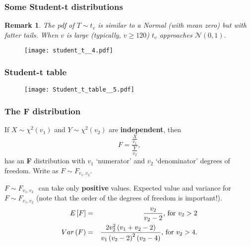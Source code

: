 \documentclass[notes=show,smaller,handout]{beamer}\usepackage[]{graphicx}\usepackage[]{color}
\newtheorem{remark}{Remark}[section]
\newcommand{\N}{\mathcal{N}}
\begin{document}
\begin{frame}%

\frametitle{Some Student-t distributions}
\begin{remark}
The pdf of $T\sim t_{v}$ is similar to a Normal (with mean zero) but with fatter tails. When $v$ is large (typically, $v \geq 120$) $t_{v}$ approaches $\N(0,1)$.
\end{remark}

\begin{figure}[ptb]\centering
\texttt{[image: student\_t\_\_4.pdf]}%
\end{figure}%


\end{frame}
\begin{frame}


\frametitle{Student-t table}

\begin{figure}[ptb]\centering
\texttt{[image: Student\_t\_table\_\_5.pdf]}%
\end{figure}

\end{frame}

\begin{frame}%

\frametitle{The F distribution}

\begin{definition}
If $X\sim \chi ^{2}(v_{1})$ and $Y\sim \chi ^{2}(v_{2})$ are \textbf{%
independent}, then%
\begin{equation*}
F=\frac{\frac{X}{v_{1}}}{\frac{Y}{v_{2}}},
\end{equation*}%
has an \textbf{F} distribution with $v_{1}$ `numerator' and $v_{2}$
`denominator' degrees of freedom. Write as $F\sim F_{v_{1},v_{2}}$.
\end{definition}

$F\sim F_{v_{1},v_{2}}\,$\ can take only \textbf{positive }values. Expected value and variance for $F\sim F_{v_{1},v_{2}}$ (note that the order of the degrees of freedom is important!).
\begin{eqnarray*}
E\left[ F\right] &=&\frac{v_{2}}{v_{2}-2}\text{, for }v_{2}>2 \\
Var\left( F\right) &=&\frac{2v_{2}^{2}\left( v_{1}+v_{2}-2\right) }{%
v_{1}\left( v_{2}-2\right) ^{2}\left( v_{2}-4\right) }\text{, for }v_{2}>4.
\end{eqnarray*}

\end{frame}
\end{document}
